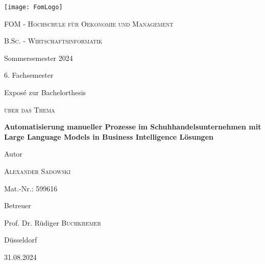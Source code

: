 
\begin{titlepage}
	
	\centering
	\texttt{[image: FomLogo]}\par\vspace{1cm}
	{\scshape\LARGE FOM - Hochschule für Oekonomie und Management \par}
	\vspace{1cm}
	{\scshape B.Sc. - Wirtschaftsinformatik\par Sommersemester 2024\par 6. Fachsemester\par Exposé zur Bachelorthesis\par}
	\vspace{1cm}
	{\scshape über das Thema\par}
	\vspace{1cm}
	{\large\bfseries Automatisierung manueller Prozesse im Schuhhandelsunternehmen mit Large Language Models in Business Intelligence Lösungen\par}
	\vspace{1.5cm}
	Autor\par
	{\large\textsc{Alexander Sadowski}\par}
	Mat.-Nr.: 599616\par
	\vfill
	Betreuer\par
	Prof. Dr. Rüdiger \textsc{Buchkremer}
	
	\vfill
	
	{Düsseldorf\par 31.08.2024\par}
\end{titlepage}